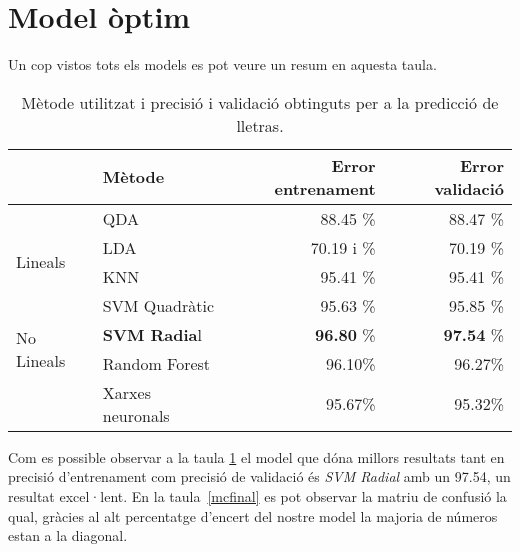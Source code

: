 \section{Model òptim}
Un cop vistos tots els models es pot veure un resum en aquesta taula.
\begin{table}[H]
	\centering
	\def\arraystretch{1.4}
	\begin{tabular}{|l|l|rr|}
		\cline{2-4}
		\multicolumn{1}{c|}{}
		& Mètode & Error entrenament & Error validació \\
		\hline
		\multirow{4}{*}{Lineals}
		& QDA & 88.45 \% & 88.47 \% \\
		& LDA & 70.19 i \% & 70.19 \% \\
		& KNN & 95.41 \% & 95.41 \% \\
		& SVM Quadràtic & 95.63 \% & 95.85 \% \\
		\hline
		\multirow{2}{*}{No Lineals}
		& \textbf{SVM Radia}l & \textbf{96.80} \% & \textbf{97.54} \% \\
		& Random Forest & 96.10\% & 96.27\% \\
		& Xarxes neuronals &  95.67\% &  95.32\% \\
		\hline
	\end{tabular}
	\caption{Mètode utilitzat i precisió i validació obtinguts per a la predicció de lletras.}
	\label{tab:metode_si_no}
\end{table}

Com es possible observar a la taula \ref{tab:metode_si_no} el model que dóna millors resultats tant en precisió d'entrenament com precisió de validació és \textit{SVM Radial} amb un 97.54, un resultat excel·lent. En la taula~\ref{mcfinal} es pot observar la matriu de confusió la qual, gràcies al alt percentatge d'encert del nostre model la majoria de números estan a la diagonal.

